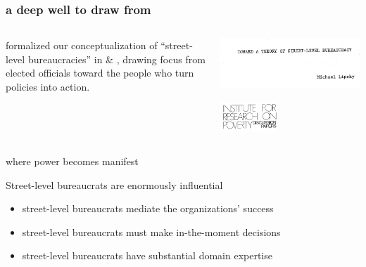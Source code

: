 \documentclass[presentation]{subfiles}
\begin{document}










\begin{frame}\frametitle{a deep well to draw from}
    
    \begin{columns}
    \begin{column}{0.5\textwidth}
{\citeauthor{lipsky1980street} formalized our conceptualization of ``street-level bureaucracies'' in
\citeyear{lipsky1969toward} \& \citeyear{lipsky1980street}, drawing focus from elected officials toward the people who \alert{turn policies into action}.}
\end{column}
\begin{column}{0.5\textwidth}
\includegraphics[width=\textwidth]{figures/books/slb_lipsky.png}

\begin{center}
\includegraphics[width=0.4\textwidth]{figures/books/irp.png}
\end{center}
\end{column}
\end{columns}

\end{frame}

\begin{frame}{where power becomes manifest}

  Street-level bureaucrats are enormously influential

  \begin{itemize}
    \item street-level bureaucrats \alert<2,5->{mediate} the organizations' success
    \item street-level bureaucrats must make \alert<3,5->{in-the-moment} decisions
    \item street-level bureaucrats have substantial \alert<4,5->{domain expertise}
  \end{itemize}

\end{frame}
\end{document}
